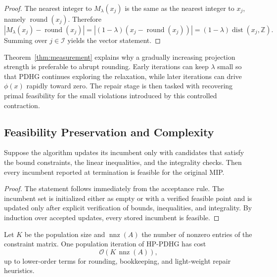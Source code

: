 \begin{proof}
The nearest integer to $M_\lambda(x_j)$ is the same as the nearest integer to $x_j$, namely $\operatorname{round}(x_j)$. Therefore
\begin{equation}
    |M_\lambda(x_j) - \operatorname{round}(x_j)|
    = |(1-\lambda)(x_j - \operatorname{round}(x_j))|
    = (1-\lambda)\operatorname{dist}(x_j, \mathbb{Z}).
\end{equation}
Summing over $j \in \mathcal{I}$ yields the vector statement.
\end{proof}

Theorem~\ref{thm:measurement} explains why a gradually increasing projection strength is preferable to abrupt rounding. Early iterations can keep $\lambda$ small so that PDHG continues exploring the relaxation, while later iterations can drive $\phi(x)$ rapidly toward zero. The repair stage is then tasked with recovering primal feasibility for the small violations introduced by this controlled contraction.

\subsection{Feasibility Preservation and Complexity}

\begin{proposition}
\label{prop:repair}
Suppose the algorithm updates its incumbent only with candidates that satisfy the bound constraints, the linear inequalities, and the integrality checks. Then every incumbent reported at termination is feasible for the original MIP.
\end{proposition}

\begin{proof}
The statement follows immediately from the acceptance rule. The incumbent set is initialized either as empty or with a verified feasible point and is updated only after explicit verification of bounds, inequalities, and integrality. By induction over accepted updates, every stored incumbent is feasible.
\end{proof}

\begin{proposition}
\label{prop:complexity}
Let $K$ be the population size and $\operatorname{nnz}(A)$ the number of nonzero entries of the constraint matrix. One population iteration of HP-PDHG has cost
\begin{equation}
    \mathcal{O}\!\left(K \, \operatorname{nnz}(A)\right),
\end{equation}
up to lower-order terms for rounding, bookkeeping, and light-weight repair heuristics.
\end{proposition}

